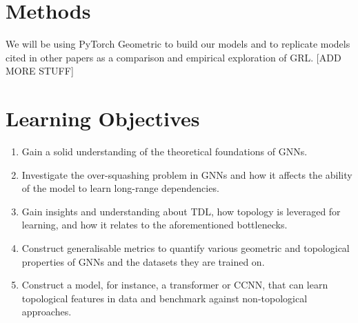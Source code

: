 \documentclass[a4paper,12pt]{article}
\begin{document}
\section{Methods}
We will be using PyTorch Geometric to build our models and to replicate models cited in other papers as a comparison and empirical exploration of GRL.
[ADD MORE STUFF]

\section{Learning Objectives}


\begin{enumerate}
    \item Gain a solid understanding of the theoretical foundations of GNNs.
    \item Investigate the over-squashing problem in GNNs and how it affects the ability of the model to learn long-range dependencies\cite{alon_bottleneck_2021}.
    \item Gain insights and understanding about TDL, how topology is leveraged for learning, and how it relates to the aforementioned bottlenecks\cite{horn_topological_2022}.
    \item Construct generalisable metrics to quantify various geometric and topological properties of GNNs and the datasets they are trained on.
    \item Construct a model, for instance, a transformer or CCNN\cite{tdlbook}, that can learn topological features in data and benchmark against non-topological approaches.
\end{enumerate}

\printbibliography
\end{document}
